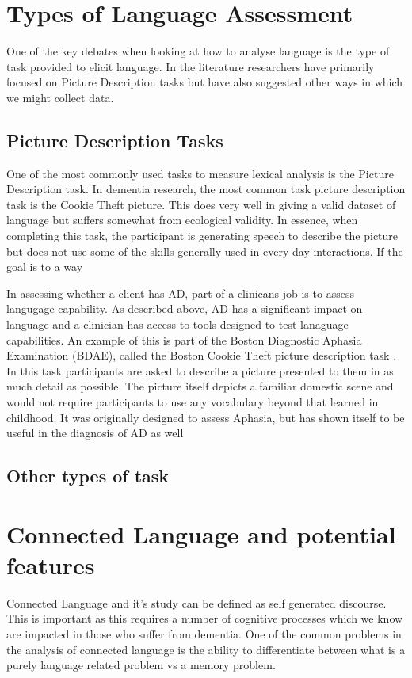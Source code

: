 \documentclass[a4paper]{article}
\begin{document}
\section {Types of Language Assessment}
One of the key debates when looking at how to analyse language is the type of task provided to elicit language. In the literature  researchers have primarily focused on Picture Description tasks but have also suggested other ways in which we might collect data. \newline
\par
\subsection{Picture Description Tasks}
One of the most commonly used tasks to measure lexical analysis is the Picture Description task. In dementia research, the most common task picture description task is the Cookie Theft picture. This does very well in giving a valid dataset of language but suffers somewhat from ecological validity. In essence, when completing this task, the participant is generating speech to describe the picture but does not use some of the skills generally used in every day interactions. If the goal is to a way 

In assessing whether a client has AD, part of a clinicans job is to assess langugage capability. As described above, AD has a significant impact on language and a clinician has access to tools designed to test lanaguage capabilities. An example of this is part of the Boston Diagnostic Aphasia Examination (BDAE), called the Boston Cookie Theft picture description task \cite{Kaplan2010} . In this task participants are asked to describe a picture presented to them in as much detail as possible. The picture itself depicts a familiar domestic scene and would not require participants to use any vocabulary beyond that learned in childhood. It was originally designed to assess Aphasia, but has shown itself to be useful in the diagnosis of AD as well \cite{Giles1996}\newline
\par
\subsection{Other types of task}
\section{Connected Language and potential features}
Connected Language and it's study can be defined as self generated discourse. This is important as this requires a number of cognitive processes which we know are impacted in those who suffer from dementia. One of the common problems in the analysis of connected language is the ability to differentiate between what is a purely language related problem vs a memory problem. \newline
\par
\end{document}
